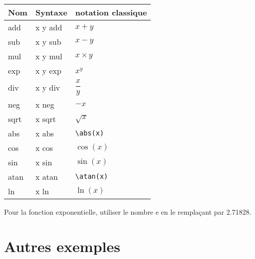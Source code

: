 \documentclass[12pt,oneside]{report}
\begin{document}
\begin{spacing}{1.2}
\begin{center}
\begin{tabular}{|*{3}{M{3cm}|}}
\hline
Nom&Syntaxe&notation classique\\
\hline
add&x y add&$x+y$\\
\hline
sub&x y sub&$x−y$\\
\hline
mul&x y mul&$x\times y$\\
\hline
exp&x y exp&$x^y$\\
\hline
div&x y div&$\dfrac{x}{y}$\\
\hline
neg&x neg&$−x$\\
\hline
sqrt&x sqrt&$\sqrt{x}$\\
\hline
abs&x abs&\verb!\abs(x)!\\
\hline
cos&x cos&$\cos(x)$\\
\hline
sin&x sin&$\sin(x)$\\
\hline
atan&x atan&\verb!\atan(x)!\\
\hline
ln&x ln&$\ln(x)$\\
\hline
\end{tabular}
\end{center}

Pour la fonction exponentielle, utiliser le nombre e en le remplaçant par 2.71828.

\newpage
\section{Autres exemples}

\begin{center}
%
\endpsclip
\end{center}


\end{spacing}
\end{document}
